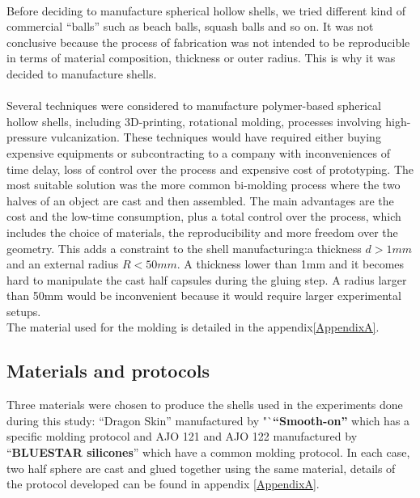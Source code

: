 \paragraph{}
Before deciding to manufacture spherical hollow shells, we tried different kind of commercial "`balls"' such as beach balls, squash balls and so on. It was not conclusive because the process of fabrication was not intended to be reproducible in terms of material composition, thickness or outer radius. This is why it was decided to manufacture shells.
\paragraph{}
Several techniques were considered to manufacture polymer-based spherical hollow shells, including 3D-printing, rotational molding, processes involving high-pressure vulcanization. These techniques would have required either buying expensive equipments or subcontracting to a company with inconveniences of time delay, loss of control over the process and expensive cost of prototyping. 
The most suitable solution was the more common bi-molding process where the two halves of an object are cast and then assembled. The main advantages are the cost and the low-time consumption, plus a total control over the process, which includes the choice of materials, the reproducibility and more freedom over the geometry.
This adds a constraint to the shell manufacturing:a thickness $d > 1 mm$ and an external radius $R < 50 mm$. A thickness lower than 1mm and it becomes hard to manipulate the cast half capsules during the gluing step. A radius larger than 50mm would be inconvenient because it would require larger experimental setups.\\
The material used for the molding is detailed in the appendix\ref{AppendixA}.

\newpage
\subsection{Materials and protocols}
Three materials were chosen to produce the shells used in the experiments done during this study: "`Dragon Skin"' manufactured by "`\textbf{"`Smooth-on\textcopyright"'} which has a specific molding protocol and AJO 121 and AJO 122 manufactured by "`\textbf{BLUESTAR silicones\textcopyright}"' which have a common molding protocol. In each case, two half sphere are cast and glued together using the same material, details of the protocol developed can be found in appendix \ref{AppendixA}.


